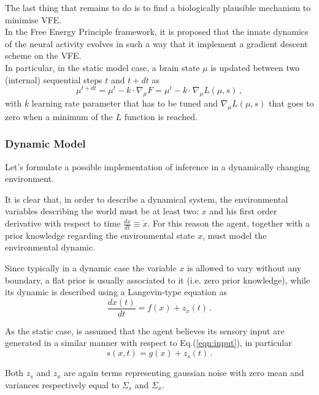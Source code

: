 \documentclass[a4paper, 10pt]{article}
\begin{document}
The last thing that remains to do is to find a biologically plausible mechanism to minimise VFE.\\
In the Free Energy Principle framework, it is proposed that the innate dynamics of the neural activity evolves in such a way that it implement a gradient descent scheme on the VFE. \\
In particular, in the static model case, a brain state $\mu$ is updated between two (internal) sequential steps $t$ and $t+dt$ as
\begin{equation}
\mu^{t+dt} = \mu^{t} - k \cdot \nabla_{\mu} F = \mu^{t} - k \cdot \nabla_{\mu} L(\mu, s) \, ,
\end{equation}
with $k$ learning rate parameter that has to be tuned and $\nabla_{\mu} L(\mu, s)$ that goes to zero when a minimum of the $L$ function is reached.

\subsubsection{Dynamic Model}
Let's formulate a possible implementation of inference in a dynamically changing environment.

It is clear that, in order to describe a dynamical system, the environmental variables describing the world must be at least two: $x$ and his first order derivative with respect to time $\frac{dx}{dt} \equiv \dot{x}$. 
For this reason the agent, together with a prior knowledge regarding the environmental state $x$, must model the environmental dynamic.

Since typically in a dynamic case the variable $x$ is allowed to vary without any boundary, a flat prior is usually associated to it (i.e. zero prior knowledge), while its dynamic is described using a Langevin-type equation as
\begin{equation}
\frac{d x(t)}{dt} = f(x) + z_{\dot{x}}(t) \, .
\label{eqn:x}
\end{equation}

As the static case, is assumed that the agent believes its sensory input are generated in a similar manner with respect to Eq.(\ref{eqn:input}), in particular
\begin{equation}
s(x,t) = g(x) + z_s(t) \, .
\label{eqn:s}
\end{equation}

Both $z_s$ and $z_{\dot{x}}$ are again terms representing gaussian noise with zero mean and variances respectively equal to $\Sigma_s$ and $\Sigma_{\dot{x}}$.
\end{document}
